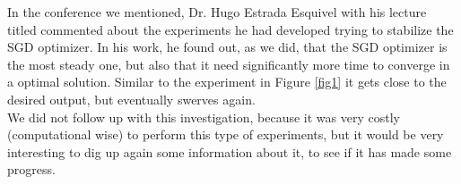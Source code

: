 \documentclass{article}
\begin{document}
In the conference we mentioned, Dr. Hugo Estrada Esquivel with his lecture titled  \cite{enoan} commented about the experiments he had developed trying to stabilize the SGD optimizer. In his work, he found out, as we did, that the SGD optimizer is the most steady one, but also that it need significantly more time to converge in a optimal solution. Similar to the experiment in Figure \ref{fig1} it gets close to the desired output, but eventually swerves again.\\

We did not follow up with this investigation, because it was very costly (computational wise) to perform this type of experiments, but it would be very interesting to dig up again some information about it, to see if it has made some progress.\\





 
\end{document}
